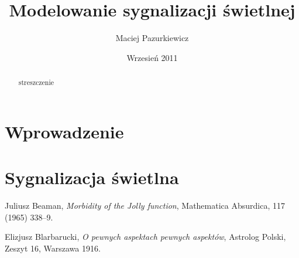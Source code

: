 \documentclass{pracamgr}
\author{Maciej Pazurkiewicz}
\title{Modelowanie sygnalizacji świetlnej}
\date{Wrzesień 2011}
\begin{document}
\maketitle

\begin{abstract}
streszczenie
\end{abstract}

\tableofcontents

\chapter*{Wprowadzenie}

\chapter{Sygnalizacja świetlna}


\begin{thebibliography}{99}

 Juliusz Beaman, \textit{Morbidity of the Jolly
    function}, Mathematica Absurdica, 117 (1965) 338--9.

 Elizjusz Blarbarucki, \textit{O pewnych
    aspektach pewnych aspektów}, Astrolog Polski, Zeszyt 16, Warszawa
  1916.
\end{thebibliography}
\end{document}
